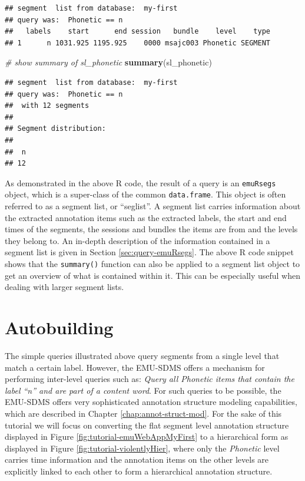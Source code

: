 \documentclass[]{book}
\newenvironment{Shaded}{\begin{snugshade}}{\end{snugshade}}
\newcommand{\CommentTok}[1]{\textcolor[rgb]{0.56,0.35,0.01}{\textit{#1}}}
\newcommand{\KeywordTok}[1]{\textcolor[rgb]{0.13,0.29,0.53}{\textbf{#1}}}
\newcommand{\NormalTok}[1]{#1}
\theoremstyle{definition}
\theoremstyle{definition}
\theoremstyle{definition}
\theoremstyle{remark}
\begin{document}
\begin{verbatim}
## segment  list from database:  my-first 
## query was:  Phonetic == n 
##   labels    start      end session   bundle    level    type
## 1      n 1031.925 1195.925    0000 msajc003 Phonetic SEGMENT
\end{verbatim}

\begin{Shaded}
\begin{Highlighting}[]
\CommentTok{# show summary of sl_phonetic}
\KeywordTok{summary}\NormalTok{(sl_phonetic)}
\end{Highlighting}
\end{Shaded}

\begin{verbatim}
## segment  list from database:  my-first 
## query was:  Phonetic == n 
##  with 12 segments
## 
## Segment distribution:
## 
##  n 
## 12
\end{verbatim}

As demonstrated in the above R code, the result of a query is an
\texttt{emuRsegs} object, which is a super-class of the common
\texttt{data.frame}. This object is often referred to as a segment list,
or ``seglist''. A segment list carries information about the extracted
annotation items such as the extracted labels, the start and end times
of the segments, the sessions and bundles the items are from and the
levels they belong to. An in-depth description of the information
contained in a segment list is given in Section
\ref{sec:query-emuRsegs}. The above R code snippet shows that the
\texttt{summary()} function can also be applied to a segment list object
to get an overview of what is contained within it. This can be
especially useful when dealing with larger segment lists.

\hypertarget{autobuilding}{%
\section{Autobuilding}\label{autobuilding}}

The simple queries illustrated above query segments from a single level
that match a certain label. However, the EMU-SDMS offers a mechanism for
performing inter-level queries such as: \emph{Query all Phonetic items
that contain the label ``n'' and are part of a content word}. For such
queries to be possible, the EMU-SDMS offers very sophisticated
annotation structure modeling capabilities, which are described in
Chapter \ref{chap:annot-struct-mod}. For the sake of this tutorial we
will focus on converting the flat segment level annotation structure
displayed in Figure \ref{fig:tutorial-emuWebAppMyFirst} to a
hierarchical form as displayed in Figure
\ref{fig:tutorial-violentlyHier}, where only the \emph{Phonetic} level
carries time information and the annotation items on the other levels
are explicitly linked to each other to form a hierarchical annotation
structure.
\end{document}

